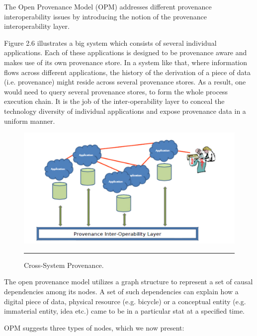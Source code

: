 The Open Provenance Model (OPM)\cite{reference13}\cite{reference34} addresses different provenance interoperability issues by introducing the notion of the provenance interoperability layer\cite{reference1}.

Figure 2.6 illustrates a big system which consists of several individual applications. Each of these applications is designed to be provenance aware and makes use of its own provenance store. In a system like that, where information flows across different applications, the history of the derivation of a piece of data (i.e. provenance) might reside across several provenance stores. As a result, one would need to query several provenance stores, to form the whole process execution chain. It is the job of the inter-operability layer to conceal the technology diversity of individual applications and expose provenance data in a uniform manner.

\begin{figure}[htbp]
	\centering
		\includegraphics[scale=0.60]{./Figures/chapter2/figure6.pdf}
		\rule{35em}{0.5pt}
	\caption[Cross-System Provenance]{Cross-System Provenance.\cite{reference1}}
	\label{fig:provAccrossSystems}
\end{figure}

The open provenance model utilizes a graph structure to represent a set of causal dependencies\cite{reference13} among its nodes. A set of such dependencies can explain how a digital piece of data, physical resource (e.g. bicycle) or a conceptual entity (e.g. immaterial entity, idea etc.) came to be in a particular stat at a specified time.

OPM suggests three types of nodes, which we now present:

